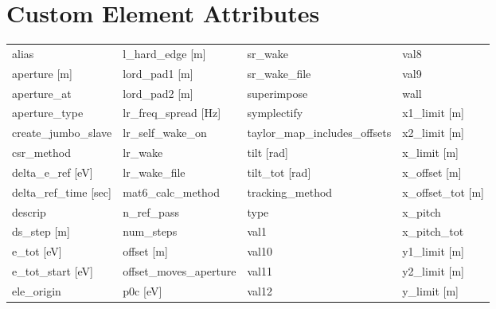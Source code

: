  \section{Custom Element Attributes}
 \label{s:list.custom}
 
 \begin{tabular}{llll} \toprule
alias                          & l_hard_edge [m]                & sr_wake                        & val8                           \\
aperture [m]                   & lord_pad1 [m]                  & sr_wake_file                   & val9                           \\
aperture_at                    & lord_pad2 [m]                  & superimpose                    & wall                           \\
aperture_type                  & lr_freq_spread [Hz]            & symplectify                    & x1_limit [m]                   \\
create_jumbo_slave             & lr_self_wake_on                & taylor_map_includes_offsets    & x2_limit [m]                   \\
csr_method                     & lr_wake                        & tilt [rad]                     & x_limit [m]                    \\
delta_e_ref [eV]               & lr_wake_file                   & tilt_tot [rad]                 & x_offset [m]                   \\
delta_ref_time [sec]           & mat6_calc_method               & tracking_method                & x_offset_tot [m]               \\
descrip                        & n_ref_pass                     & type                           & x_pitch                        \\
ds_step [m]                    & num_steps                      & val1                           & x_pitch_tot                    \\
e_tot [eV]                     & offset [m]                     & val10                          & y1_limit [m]                   \\
e_tot_start [eV]               & offset_moves_aperture          & val11                          & y2_limit [m]                   \\
ele_origin                     & p0c [eV]                       & val12                          & y_limit [m]                    \\

\end{tabular}
